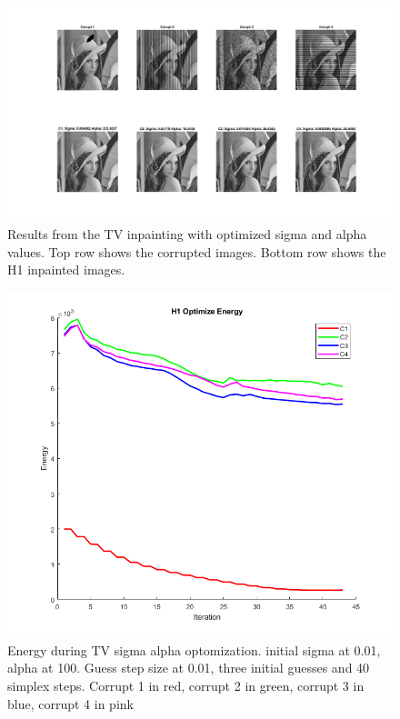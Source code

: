 \documentclass[12pt]{article}
\begin{document}
\begin{figure}[H]
	
	
	\hspace{-1.5in}
	\includegraphics[width = 1.4\textwidth]{Figures/TVResults.png}
	\caption{Results from the TV inpainting with optimized sigma and alpha values. Top row shows the corrupted images. Bottom row shows the H1 inpainted images. }
	\label{fig:TV1}
\end{figure}
\begin{figure}[H]
	
	
	
	\includegraphics[width = .9\textwidth]{Figures/TVEnergy.png}
	\caption{Energy during TV sigma alpha optomization. initial sigma at 0.01, alpha at 100. Guess step size at 0.01, three initial guesses and 40 simplex steps. Corrupt 1 in red, corrupt 2 in green, corrupt 3 in blue, corrupt 4 in pink}
	\label{fig:TV_e}
\end{figure}
\end{document}
